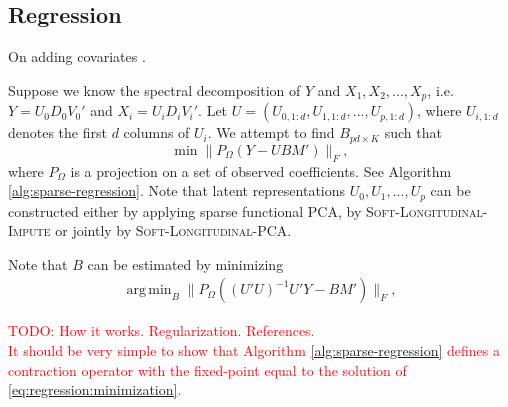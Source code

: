 \documentclass[preprint]{imsart}
\numberwithin{equation}{section}
\theoremstyle{plain}
\newcommand{\tr}[1]{{\textcolor{red}{#1}}}
\DeclareMathOperator*{\argmin}{arg\,min}
\begin{document}
\subsection{Regression}

On adding covariates \cite{condli1999bayesian}.

Suppose we know the spectral decomposition of $Y$ and $X_1, X_2, ..., X_p$, i.e. $Y = U_0 D_0 V_0'$ and $X_i = U_i D_i V_i'$.
Let $U = (U_{0,1:d},U_{1,1:d},...,U_{p,1:d})$, where $U_{i,1:d}$ denotes the first $d$ columns of $U_i$. We attempt to find $B_{pd \times K}$ such that
\[
\min \|P_\Omega(Y - UBM')\|_F,
\]
where $P_\Omega$ is a projection on a set of observed coefficients. See Algorithm \ref{alg:sparse-regression}. Note that latent representations $U_0,U_1,...,U_p$ can be constructed either by applying sparse functional PCA, by \textsc{Soft-Longitudinal-Impute} or jointly by \textsc{Soft-Longitudinal-PCA}.

Note that $B$ can be estimated by minimizing 
\begin{align}\label{eq:regression:minimization}
\argmin_B \|P_\Omega((U'U)^{-1}U'Y - BM')\|_F,
\end{align}


\tr{TODO: How it works. Regularization. References.\\
It should be very simple to show that Algorithm \ref{alg:sparse-regression} defines a contraction operator with the fixed-point equal to the solution of \eqref{eq:regression:minimization}. \citep{bertsekas1999nonlinear}
}
\end{document}
